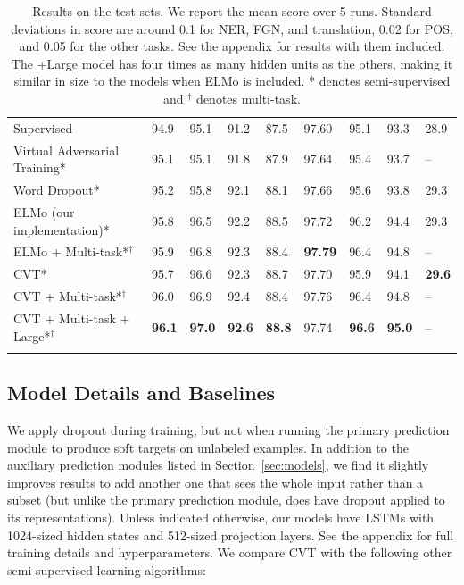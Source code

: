 \documentclass[11pt,a4paper]{article}
\newcommand\Tstrut{\rule{0pt}{2.6ex}}         %
\newcommand\Bstrut{\rule[-1.0ex]{0pt}{0pt}}   %
\newcommand{\thickline}{\Xhline{2.5\arrayrulewidth}}
\newcommand{\tbottom}{\Bstrut \\ \thickline}
\begin{document}
\begin{table}[tb!]
\begin{tabularx}{\textwidth}{X | l l l l l | l l | l}
  Supervised & 94.9 & 95.1 & 91.2 & 87.5 & 97.60 & 95.1 & 93.3 & 28.9  \Tstrut \\
  Virtual Adversarial Training* & 95.1 & 95.1 & 91.8 & 87.9 & 97.64 & 95.4 & 93.7 & --  \\
  Word Dropout* & 95.2 & 95.8 & 92.1 & 88.1 & 97.66 & 95.6 & 93.8 & 29.3  \\
  ELMo (our implementation)* &  95.8 & 96.5  & 92.2  & 88.5 & 97.72 & 96.2 & 94.4  & 29.3  \\ 
  ELMo + Multi-task*$^\dagger$ & 95.9 &  96.8 & 92.3 & 88.4 & \textbf{97.79} & 96.4 & 94.8 & -- \\
  CVT* & 95.7 & 96.6 & 92.3  & 88.7 & 97.70 & 95.9 & 94.1 &  \textbf{29.6} \\
  CVT + Multi-task*$^\dagger$ & 96.0 &  96.9 & 92.4 & 88.4 & 97.76 & 96.4 &  94.8 & -- \\
  CVT + Multi-task + Large*$^\dagger$ & \textbf{96.1} &  \textbf{97.0} & \textbf{92.6} & \textbf{88.8} & 97.74 & \textbf{96.6} &  \textbf{95.0} & -- \tbottom
\end{tabularx}
\vspace{-1mm}
\caption{Results on the test sets. We report the mean score over 5 runs. Standard deviations in score are around 0.1 for NER, FGN, and  translation, 0.02 for POS, and 0.05 for the other tasks. See the appendix for results with them included. The +Large model has four times as many hidden units as the others, making it similar in size to the models when ELMo is included. 
* denotes semi-supervised and
$^\dagger$ denotes multi-task.} 
\vspace{-1mm}
\label{tab:nlp}
\end{table}
\addtolength{\tabcolsep}{2pt}
 

\subsection{Model Details and Baselines}
We apply dropout during training, but not when running the primary prediction module to produce soft targets on unlabeled examples. In addition to the auxiliary prediction modules listed in Section~\ref{sec:models}, we find it slightly improves results to add another one that sees the whole input rather than a subset (but unlike the primary prediction module, does have dropout applied to its representations). 
Unless indicated otherwise, our models have LSTMs with 1024-sized hidden states and 512-sized projection layers. 
See the appendix for full training details and hyperparameters. We compare CVT with the following other semi-supervised learning algorithms:
\end{document}
